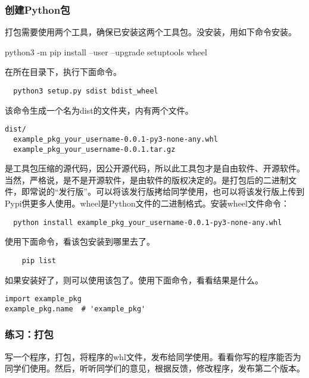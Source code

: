 \subsubsection{创建Python包}
打包需要使用两个工具，确保已安装这两个工具包。没安装，用如下命令安装。
\begin{framed}
  python3 -m pip install --user --upgrade setuptools wheel
\end{framed}
在所在目录下，执行下面命令。
\begin{framed}
\begin{verbatim}
  python3 setup.py sdist bdist_wheel
\end{verbatim}
\end{framed}
该命令生成一个名为dist的文件夹，内有两个文件。
\begin{framed}
\begin{verbatim}
dist/
  example_pkg_your_username-0.0.1-py3-none-any.whl
  example_pkg_your_username-0.0.1.tar.gz
\end{verbatim}
\end{framed}
是工具包压缩的源代码，因公开源代码，所以此工具包才是自由软件、开源软件。当然，严格说，是不是开源软件，是由软件的版权决定的。是打包后的二进制文件，即常说的“发行版”。可以将该发行版拷给同学使用，也可以将该发行版上传到Pypi供更多人使用。wheel是Python文件的二进制格式。安装wheel文件命令：
\begin{framed}
\begin{verbatim}
  python install example_pkg_your_username-0.0.1-py3-none-any.whl
\end{verbatim}
\end{framed}
使用下面命令，看该包安装到哪里去了。
\begin{framed}
\begin{verbatim}
    pip list
\end{verbatim}
\end{framed}
如果安装好了，则可以使用该包了。使用下面命令，看看结果是什么。
\begin{framed}
\begin{verbatim}
import example_pkg
example_pkg.name  # 'example_pkg'
\end{verbatim}
\end{framed}
\subsubsection{练习：打包}
写一个程序，打包，将程序的whl文件，发布给同学使用。看看你写的程序能否为同学们使用。然后，听听同学们的意见，根据反馈，修改程序，发布第二个版本。

